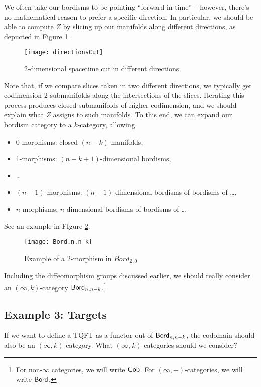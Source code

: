 We often take our bordisms to be pointing ``forward in time'' -- however, there's no mathematical reason to prefer a specific direction.
In particular, we should be able to compute $Z$ by slicing up our manifolds along different directions, as depucted in Figure \ref{fig:directionCuts}.
\begin{figure}[h]
\centering
\texttt{[image: directionsCut]}
\caption{2-dimensional spacetime cut in different directions}
\label{fig:directionCuts}
\end{figure}
Note that, if we compare slices taken in two different directions, we typically get codimension 2 submanifolds along the intersections of the slices.
Iterating this process produces closed submanifolds of higher codimension, and we should explain what $Z$ assigns to such manifolds.
To this end, we can expand our bordism category to a $k$-category, allowing
\begin{itemize}
	\item 0-morphisms: closed $(n-k)$-manifolds,
	\item 1-morphisms: $(n-k+1)$-dimensional bordisms,
	\item \dots
	\item $(n - 1)$-morphisms: $(n-1)$-dimensional bordisms of bordisms of \dots,
	\item $n$-morphisms: $n$-dimensional bordisms of bordisms of \dots
\end{itemize}
See an example in FIgure \ref{fig:Bord.n.n-k}.
\begin{figure}[h]
\centering
\texttt{[image: Bord.n.n-k]}
\caption{Example of a $2$-morphism in $Bord_{2,0}$}
\label{fig:Bord.n.n-k}
\end{figure}
Including the diffeomorphism groups discussed earlier, we should really consider an $(\infty, k)$-category $\mathsf{Bord}_{n,n-k}$.\footnote{For non-$\infty$ categories, we will write $\mathsf{Cob}$.
For $(\infty, -)$-categories, we will write $\mathsf{Bord}$.}

\subsection{Example 3: Targets}

If we want to define a TQFT as a functor out of $\mathsf{Bord}_{n,n-k}$, the codomain should also be an $(\infty, k)$-category.
What $(\infty, k)$-categories should we consider?

